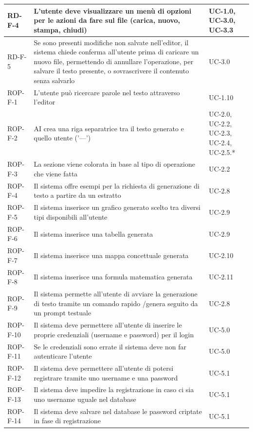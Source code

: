 \documentclass[11pt,a4paper]{article}
\begin{document}
\begin{longtable}{|p{}|>{\raggedright\arraybackslash}p{}|p{}|}
\hline
RD-F-4 & L'utente deve visualizzare un menù di opzioni per le azioni da fare sul file (carica, nuovo, stampa, chiudi) & UC-1.0, UC-3.0, UC-3.3 \\
\hline
RD-F-5 & Se sono presenti modifiche non salvate nell'editor, il sistema chiede conferma all'utente prima di caricare un nuovo file, permettendo di annullare l'operazione, per salvare il testo presente, o sovrascrivere il contenuto senza salvarlo & UC-3.0 \\
\hline
ROP-F-1 & L'utente può ricercare parole nel testo attraverso l'editor & UC-1.10 \\
\hline
ROP-F-2 & AI crea una riga separatrice tra il testo generato e quello utente ('---') & UC-2.0, UC-2.2, UC-2.3, UC-2.4, UC-2.5.* \\
\hline
ROP-F-3 & La sezione viene colorata in base al tipo di operazione che viene fatta & UC-2.2 \\
\hline
ROP-F-4 & Il sistema offre esempi per la richiesta di generazione di testo a partire da un estratto & UC-2.8 \\
\hline
ROP-F-5 & Il sistema inserisce un grafico generato scelto tra diversi tipi disponibili all'utente & UC-2.9 \\
\hline
ROP-F-6 & Il sistema inserisce una tabella generata & UC-2.9 \\
\hline
ROP-F-7 & Il sistema inserisce una mappa concettuale generata & UC-2.10 \\
\hline
ROP-F-8 & Il sistema inserisce una formula matematica generata & UC-2.11 \\
\hline
ROP-F-9 & Il sistema permette all'utente di avviare la generazione di testo tramite un comando rapido /genera seguito da un prompt testuale & UC-2.8 \\
\hline
ROP-F-10 & Il sistema deve permettere all'utente di inserire le proprie credenziali (username e password) per il login & UC-5.0 \\
\hline
ROP-F-11 & Se le credenziali sono errate il sistema deve non far autenticare l'utente & UC-5.0 \\
\hline
ROP-F-12 & Il sistema deve permettere all'utente di potersi registrare tramite uno username e una password & UC-5.1 \\
\hline
ROP-F-13 & Il sistema deve impedire la registrazione in caso ci sia uno username uguale nel database & UC-5.1 \\
\hline
ROP-F-14 & Il sistema deve salvare nel database le password criptate in fase di registrazione & UC-5.1 \\

\end{longtable}
\end{document}
